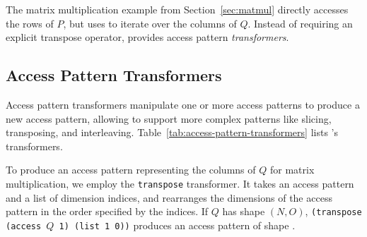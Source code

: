   
The matrix multiplication example
  from Section~\ref{sec:matmul}
  directly accesses the rows of $P$,
  but uses  to iterate over
  the columns of $Q$.
Instead of requiring an explicit
  transpose operator, \g provides
  access pattern \textit{transformers}.
  
\subsection{Access Pattern Transformers}

Access pattern transformers 
  manipulate one
  or more access patterns
  to produce a new access pattern,
  allowing \g
  to support more complex patterns
  like
  slicing,
  transposing,
  and interleaving.
  Table~\ref{tab:access-pattern-transformers}
  lists \g's transformers.
  
To produce an access pattern
  representing
  the columns of $Q$
  for matrix multiplication,
  we employ
  the \texttt{transpose}
  transformer.
It takes an access pattern
  and a list of dimension indices,
  and rearranges
  the dimensions 
  of the access pattern
  in the order specified by the indices.
If $Q$ has shape $(N, O)$,
  \texttt{(transpose (access $Q$ 1) (list 1 0))}
  produces
  an access pattern
  of shape
  .
  

